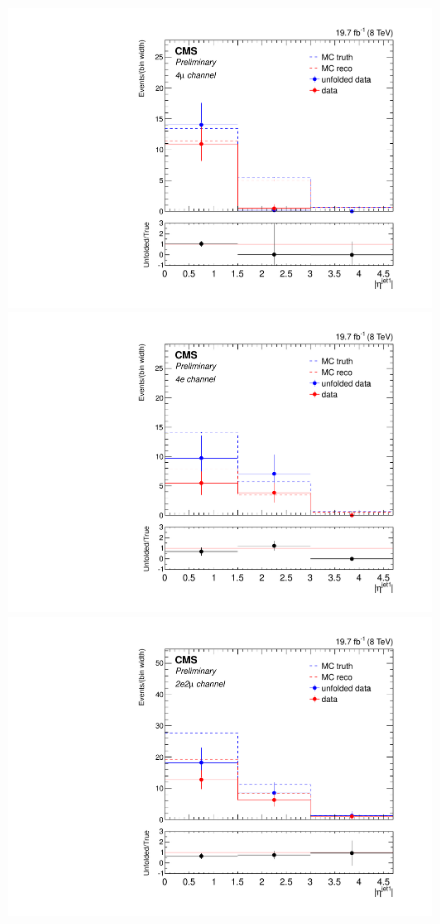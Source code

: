 \begin{figure}[hbtp]
  \begin{center}
    \includegraphics[width=\cmsFigWidth]{Figures/EtaJet1_ZZTo4m_Mad_fr_binwidth}
    \includegraphics[width=\cmsFigWidth]{Figures/EtaJet1_ZZTo4e_Mad_fr_binwidth}
    \includegraphics[width=\cmsFigWidth]{Figures/EtaJet1_ZZTo2e2m_Mad_fr_binwidth}  

\end{center}
\end{figure}
